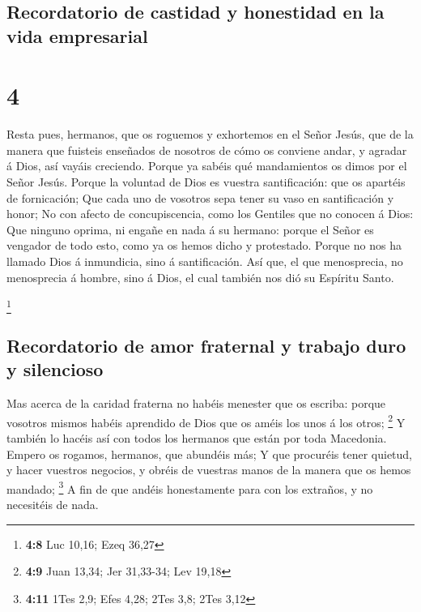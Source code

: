\hypertarget{recordatorio-de-castidad-y-honestidad-en-la-vida-empresarial}{%
\subsection{Recordatorio de castidad y honestidad en la vida
empresarial}\label{recordatorio-de-castidad-y-honestidad-en-la-vida-empresarial}}

\hypertarget{section-3}{%
\section{4}\label{section-3}}

 Resta pues, hermanos, que os roguemos y exhortemos en el
Señor Jesús, que de la manera que fuisteis enseñados de nosotros de cómo
os conviene andar, y agradar á Dios, así vayáis creciendo.
 Porque ya sabéis qué mandamientos os dimos por el Señor
Jesús.  Porque la voluntad de Dios es vuestra
santificación: que os apartéis de fornicación;  Que cada
uno de vosotros sepa tener su vaso en santificación y honor;
 No con afecto de concupiscencia, como los Gentiles que no
conocen á Dios:  Que ninguno oprima, ni engañe en nada á
su hermano: porque el Señor es vengador de todo esto, como ya os hemos
dicho y protestado.  Porque no nos ha llamado Dios á
inmundicia, sino á santificación.  Así que, el que
menosprecia, no menosprecia á hombre, sino á Dios, el cual también nos
dió su Espíritu Santo.

\footnote{\textbf{4:8} Luc 10,16; Ezeq 36,27}

\hypertarget{recordatorio-de-amor-fraternal-y-trabajo-duro-y-silencioso}{%
\subsection{Recordatorio de amor fraternal y trabajo duro y
silencioso}\label{recordatorio-de-amor-fraternal-y-trabajo-duro-y-silencioso}}

 Mas acerca de la caridad fraterna no habéis menester que
os escriba: porque vosotros mismos habéis aprendido de Dios que os améis
los unos á los otros; \footnote{\textbf{4:9} Juan 13,34; Jer 31,33-34;
  Lev 19,18}  Y también lo hacéis así con todos los
hermanos que están por toda Macedonia. Empero os rogamos, hermanos, que
abundéis más;  Y que procuréis tener quietud, y hacer
vuestros negocios, y obréis de vuestras manos de la manera que os hemos
mandado; \footnote{\textbf{4:11} 1Tes 2,9; Efes 4,28; 2Tes 3,8; 2Tes
  3,12}  A fin de que andéis honestamente para con los
extraños, y no necesitéis de nada.

